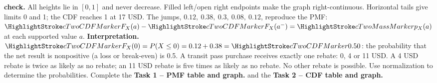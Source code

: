   \hfill%
  \begin{minipage}[t]{.60\linewidth}%
    \vspace{0pt}\centering
  \end{minipage}%
  \par
  \textbf{ check.} All heights lie in $[0,1]$ and never decrease. Filled left/open right endpoints make the
  graph right-continuous. Horizontal tails give limits 0 and 1; the CDF reaches 1 at 17 USD. The jumps, $0.12,\
    0.38,\ 0.3,\ 0.08,\ 0.12$, reproduce the PMF: $\cTwoCDFHL{F_X(a)}-\cTwoCDFHL{F_X(a^-)}=\cTwoMassHL{p_X(a)}$ at each supported value $a$.
  \textbf{Interpretation.} $\cTwoCDFHL{F_X(0)}=P(X\leq0)=0.12+0.38=\cTwoCDFHL{0.50}$: the probability that the net result is nonpositive (a loss or
  break-even) is 0.5.
  \vfill
  \clearpage
  A transit pass purchase receives exactly one rebate: 0, 4 or 11 USD.
  A 4 USD rebate is twice as likely as no rebate; an 11 USD rebate is
  five times as likely as no rebate. No other rebate is possible.
  Use normalization to determine the probabilities. Complete the \textbf{Task 1 -- PMF table and graph.} and the \textbf{Task 2 -- CDF table and graph.}


